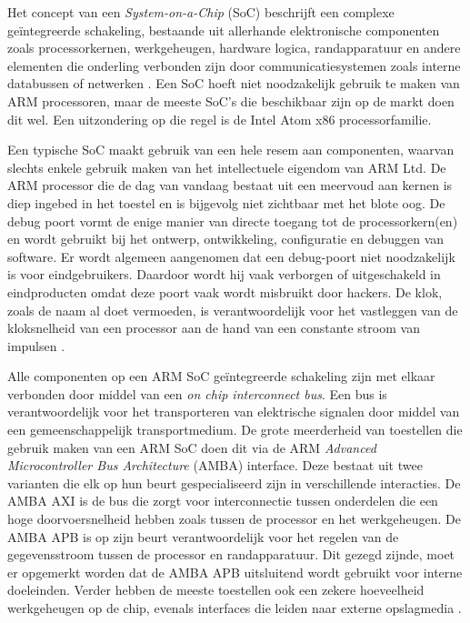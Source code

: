 Het concept van een \textit{System-on-a-Chip} (SoC) beschrijft een complexe geïntegreerde schakeling, bestaande uit allerhande elektronische componenten zoals processorkernen, werkgeheugen, hardware logica, randapparatuur en andere elementen die onderling verbonden zijn door communicatiesystemen zoals interne databussen of netwerken \autocite{MathWorks2022}. Een SoC hoeft niet noodzakelijk gebruik te maken van ARM processoren, maar de meeste SoC’s die beschikbaar zijn op de markt doen dit wel. Een uitzondering op die regel is de Intel Atom x86 processorfamilie.

Een typische SoC maakt gebruik van een hele resem aan componenten, waarvan slechts enkele gebruik maken van het intellectuele eigendom van ARM Ltd. De ARM processor die de dag van vandaag bestaat uit een meervoud aan kernen is diep ingebed in het toestel en is bijgevolg niet zichtbaar met het blote oog. De debug poort vormt de enige manier van directe toegang tot de processorkern(en) en wordt gebruikt bij het ontwerp, ontwikkeling, configuratie en debuggen van software. Er wordt algemeen aangenomen dat een debug-poort niet noodzakelijk is voor eindgebruikers. Daardoor wordt hij vaak verborgen of uitgeschakeld in eindproducten omdat deze poort vaak wordt misbruikt door hackers. De klok, zoals de naam al doet vermoeden, is verantwoordelijk voor het vastleggen van de kloksnelheid van een processor aan de hand van een constante stroom van impulsen \autocite{Shaw2013}. 

Alle componenten op een ARM SoC geïntegreerde schakeling zijn met elkaar verbonden door middel van een \textit{on chip interconnect bus}. Een bus is verantwoordelijk voor het transporteren van elektrische signalen door middel van een gemeenschappelijk transportmedium. De grote meerderheid van toestellen die gebruik maken van een ARM SoC doen dit via de ARM \textit{Advanced Microcontroller Bus Architecture} (AMBA) interface. Deze bestaat uit twee varianten die elk op hun beurt gespecialiseerd zijn in verschillende interacties. De AMBA AXI is de bus die zorgt voor interconnectie tussen onderdelen die een hoge doorvoersnelheid hebben zoals tussen de processor en het werkgeheugen. De AMBA APB is op zijn beurt verantwoordelijk voor het regelen van de gegevensstroom tussen de processor en randapparatuur. Dit gezegd zijnde, moet er opgemerkt worden dat de AMBA APB uitsluitend wordt gebruikt voor interne doeleinden. Verder hebben de meeste toestellen ook een zekere hoeveelheid werkgeheugen op de chip, evenals interfaces die leiden naar externe opslagmedia \autocite{Shaw2013}.

